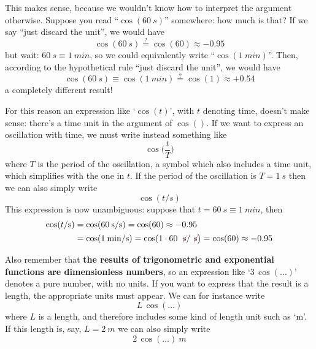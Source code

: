 \documentclass[a4paper,12pt,%
onecolumn,oneside,titlepage,%
british%
]{memoir}
\renewcommand*{\|}[1][]{\nonscript\:#1\vert\nonscript\:\mathopen{}}
\begin{document}
This makes sense, because we wouldn't know how to interpret the argument otherwise. Suppose you read \enquote{$\cos(\qty{60}{s})$} somewhere: how much is that? If we say \enquote{just discard the unit}, we would have
\begin{equation*}
  \cos(\qty{60}{s}) \stackrel{?}{=} \cos(60) \approx -0.95
\end{equation*}
but wait: $\qty{60}{s}\equiv\qty{1}{min}$, so we could equivalently write \enquote{$\cos(\qty{1}{min})$}. Then, according to the hypothetical rule \enquote{just discard the unit}, we would have
\begin{equation*}
  \cos(\qty{60}{s}) \equiv \cos(\qty{1}{min})\stackrel{?}{=} \cos(1) \approx +0.54
\end{equation*}
a completely different result!

For this reason an expression like \enquote*{$\cos(t)$}, with $t$ denoting time, doesn't make sense: there's a time unit in the argument of $\cos()$. If we want to express an oscillation with time, we must write instead something like
\begin{equation*}
  \cos\biggl(\frac{t}{T}\biggr)
\end{equation*}
where $T$ is the period of the oscillation, a symbol which also includes a time unit, which simplifies with the one in $t$. If the period of the oscillation is $T=\qty{1}{s}$ then we can also simply write
\begin{equation*}
  \cos(t/\unit{s})
\end{equation*}
This expression is now unambiguous: suppose that $t=\qty{60}{s}\equiv\qty{1}{min}$, then
\begin{equation*}
  \begin{aligned}
    \cos(t/\unit{s})
    &= \cos(\qty{60}{s}/\unit{s}) =\cos(60) \approx -0.95
    \\
    &= \cos(\qty{1}{min}/\unit{s}) =\cos(1\cdot 60\:\mathcolor{red}{\not}\!\unit{s}/\mathcolor{red}{\not}\!\unit{s}\bigr)
=\cos(60) \approx -0.95
  \end{aligned}
\end{equation*}

\smallskip

Also remember that \textbf{the results of trigonometric and exponential functions are dimensionless numbers}, so an expression like \enquote*{$3\,\cos(\dotso)$} denotes a pure number, with no units. If you want to express that the result is a length, the appropriate units must appear. We can for instance write
\begin{equation*}
  L\,\cos(\dotso)
\end{equation*}
where $L$ is a length, and therefore includes some kind of length unit such as \enquote*{\unit{m}}. If this length is, say, $L=\qty{2}{m}$ we can also simply write
\begin{equation*}
  2\,\cos(\dotso)\:\unit{m}
\end{equation*}
\end{document}
